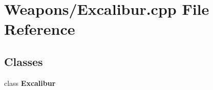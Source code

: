 \section{Weapons/\-Excalibur.cpp File Reference}
\label{_excalibur_8cpp}
\subsection*{Classes}
\begin{DoxyCompactItemize}
\item 
class {\bf Excalibur}
\end{DoxyCompactItemize}

